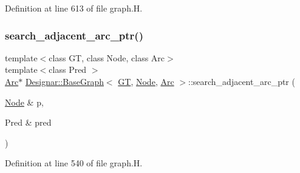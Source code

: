 Definition at line 613 of file graph.\+H.

\mbox{\label{class_designar_1_1_base_graph_a4c9703fdb22d4e1d3cf0428fd705b3ee}} 
\subsubsection{\texorpdfstring{search\+\_\+adjacent\+\_\+arc\+\_\+ptr()}{search\_adjacent\_arc\_ptr()}\hspace{0.1cm}{\footnotesize\ttfamily [1/2]}}
{\footnotesize\ttfamily template$<$class GT, class Node, class Arc$>$ \\
template$<$class Pred $>$ \\
\hyperlink{namespace_designar_a3f55fb5513d62ff47cbc8f72b8e95d6f}{Arc}$\ast$ \hyperlink{class_designar_1_1_base_graph}{Designar\+::\+Base\+Graph}$<$ \hyperlink{demo-buildgraph_8_c_a3001c40d2c31ca87ed96cd7d1334a55e}{GT}, \hyperlink{namespace_designar_a5af326c65aa2bd26b26c410f2030d09e}{Node}, \hyperlink{namespace_designar_a3f55fb5513d62ff47cbc8f72b8e95d6f}{Arc} $>$\+::search\+\_\+adjacent\+\_\+arc\+\_\+ptr (\begin{DoxyParamCaption}\item[{\hyperlink{namespace_designar_a5af326c65aa2bd26b26c410f2030d09e}{Node} \&}]{p,  }\item[{Pred \&}]{pred }\end{DoxyParamCaption})\hspace{0.3cm}{\ttfamily [inline]}}



Definition at line 540 of file graph.\+H.

\mbox{\label{class_designar_1_1_base_graph_aac7ed362d5f21fcc6e583d4b9e03babb}} 
